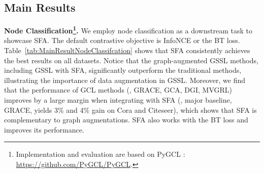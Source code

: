  

\subsection{Main Results}
\noindent\textbf{Node Classification\footnote{Implementation and evaluation are based on  PyGCL \cite{DBLP:journals/corr/pygcl}: \url{https://github.com/PyGCL/PyGCL}.}.}
We employ  node classification as a downstream task to showcase  SFA. The default contrastive objective is InfoNCE or the BT loss. Table~\ref{tab:MainResultNodeClassifcation} shows that SFA consistently achieves the best results on all datasets. Notice that the graph-augmented  GSSL methods, including GSSL with SFA, significantly outperform the traditional methods, illustrating the importance of data augmentation in GSSL. Moreover, we find that the performance of GCL methods (\ie, GRACE, GCA, DGI, MVGRL) improves by a large margin when integrating with SFA (\eg, major baseline, GRACE, yields 3\% and 4\% gain on  Cora and Citeseer), which shows that SFA  is complementary to graph augmentations. SFA  
 also works with the BT loss and  improves its performance.





